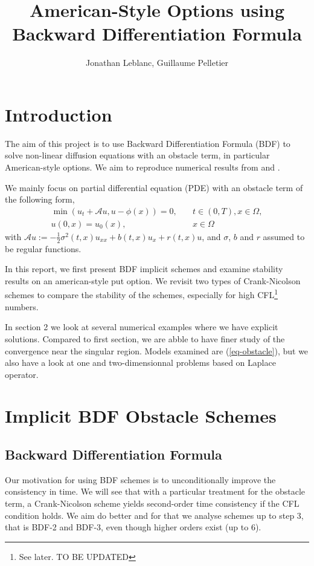 \documentclass[12pt,a4paper]{article}
\author{Jonathan Leblanc, Guillaume Pelletier}
\title{American-Style Options using Backward Differentiation Formula}
\begin{document}
\maketitle
\newpage

\section{Introduction}

The aim of this project is to use Backward Differentiation Formula (BDF) to solve non-linear diffusion equations with an obstacle term, in particular American-style options. We aim to reproduce numerical results from \cite{Boka} and \cite{Oosterlee}.

We mainly focus on partial differential equation (PDE) with an obstacle term of the following form,
\begin{align}
	\min \left( u_t + \mathcal{A} u, u - \phi(x) \right) = 0,& \quad t \in (0,T), x \in \Omega, \label{eq-obstacle}\\
	u(0, x) = u_0(x),& \quad x \in \Omega \label{eq-obstacle_initcond}
\end{align}
with $\mathcal{A}u := -\frac{1}{2} \sigma^2(t,x) u_{xx} + b(t,x) u_x + r(t,x) u$, and $\sigma$, $b$ and $r$ assumed to be regular functions.

In this report, we first present BDF implicit schemes and examine stability results on an american-style put option. We revisit two types of Crank-Nicolson schemes to compare the stability of the schemes, especially for high CFL\footnote{See later. TO BE UPDATED} numbers.

In section 2 we look at several numerical examples where we have explicit solutions. Compared to first section, we are abble to have finer study of the convergence near the singular region. Models examined are (\ref{eq-obstacle}), but we also have a look at one and two-dimensionnal problems based on Laplace operator.

\section{Implicit BDF Obstacle Schemes}

	\subsection{Backward Differentiation Formula}

Our motivation for using BDF schemes is to unconditionally improve the consistency in time. We will see that with a particular treatment for the obstacle term, a Crank-Nicolson scheme yields second-order time consistency if the CFL condition holds. We aim do better and for that we analyse schemes up to step 3, that is BDF-2 and BDF-3, even though higher orders exist (up to 6).
\end{document}
